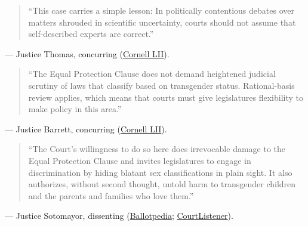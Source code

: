 \documentclass[12pt]{article}
\begin{document}
\begin{quote}
``This case carries a simple lesson: In politically contentious debates over matters shrouded in scientific uncertainty, courts should not assume that self-described experts are correct.''
\end{quote}
\noindent --- Justice Thomas, concurring (\href{https://www.law.cornell.edu/supremecourt/text/23-477}{Cornell LII}).

\begin{quote}
``The Equal Protection Clause does not demand heightened judicial scrutiny of laws that classify based on transgender status. Rational-basis review applies, which means that courts must give legislatures flexibility to make policy in this area.''
\end{quote}
\noindent --- Justice Barrett, concurring (\href{https://www.law.cornell.edu/supremecourt/text/23-477}{Cornell LII}).

\begin{quote}
``The Court's willingness to do so here does irrevocable damage to the Equal Protection Clause and invites legislatures to engage in discrimination by hiding blatant sex classifications in plain sight. It also authorizes, without second thought, untold harm to transgender children and the parents and families who love them.''
\end{quote}
\noindent --- Justice Sotomayor, dissenting (\href{https://ballotpedia.org/United_States_v._Skrmetti}{Ballotpedia}; \href{https://www.courtlistener.com/opinion/10776831/united-states-v-skrmetti/}{CourtListener}).
\end{document}
